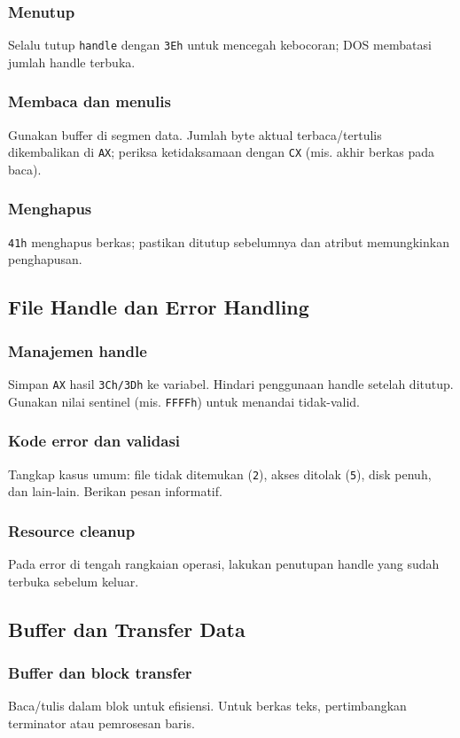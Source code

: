 \subsubsection{Menutup}
Selalu tutup \texttt{handle} dengan \texttt{3Eh} untuk mencegah kebocoran; DOS membatasi jumlah handle terbuka.

\subsubsection{Membaca dan menulis}
Gunakan buffer di segmen data. Jumlah byte aktual terbaca/tertulis dikembalikan di \texttt{AX}; periksa ketidaksamaan dengan \texttt{CX} (mis. akhir berkas pada baca).

\subsubsection{Menghapus}
\texttt{41h} menghapus berkas; pastikan ditutup sebelumnya dan atribut memungkinkan penghapusan.

\subsection{File Handle dan Error Handling}
\subsubsection{Manajemen handle}
Simpan \texttt{AX} hasil \texttt{3Ch/3Dh} ke variabel. Hindari penggunaan handle setelah ditutup. Gunakan nilai sentinel (mis. \texttt{FFFFh}) untuk menandai tidak-valid.

\subsubsection{Kode error dan validasi}
Tangkap kasus umum: file tidak ditemukan (\texttt{2}), akses ditolak (\texttt{5}), disk penuh, dan lain-lain. Berikan pesan informatif.

\subsubsection{Resource cleanup}
Pada error di tengah rangkaian operasi, lakukan penutupan handle yang sudah terbuka sebelum keluar.

\subsection{Buffer dan Transfer Data}
\subsubsection{Buffer dan block transfer}
Baca/tulis dalam blok untuk efisiensi. Untuk berkas teks, pertimbangkan terminator atau pemrosesan baris.

